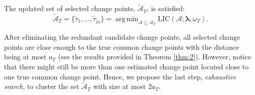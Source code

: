 \documentclass[11pt]{article}
\DeclareMathOperator*{\argmin}{arg\,min}
\begin{document}
The updated set of selected change points, $\widetilde{\mathcal{A}}_T$, is satisfied:
\begin{equation*}
    \widetilde{\mathcal{A}}_T = \{\widetilde{\tau}_1, \dots, \widetilde{\tau}_{\widetilde{m}}\} = \argmin_{\mathcal{A} \subseteq \widehat{\mathcal{A}}_T}\text{LIC}(\mathcal{A}; \bm{\lambda}, \omega_T).
\end{equation*}

After eliminating the redundant candidate change points, all selected change points are close enough to the true common change points with the distance being at most $a_T$ (see the results provided in Theorem \ref{thm:2}). However, notice that there might still be more than one estimated change point located close to one true common change point. Hence, we propose the last step, \emph{exhaustive search}, to cluster the set $\widetilde{\mathcal{A}}_T$ with size at most $2a_T$. 
\end{document}
